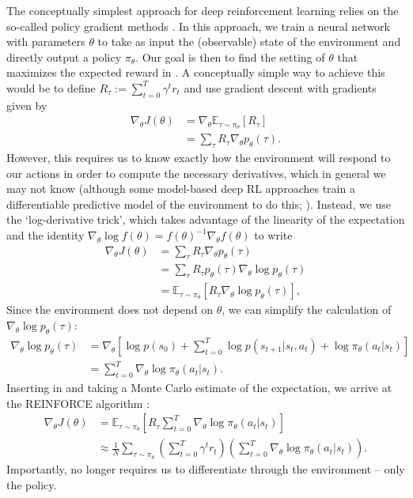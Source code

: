 The conceptually simplest approach for deep reinforcement learning relies on the so-called policy gradient methods \citep{sutton2018reinforcement}.
In this approach, we train a neural network with parameters $\theta$ to take as input the (observable) state of the environment and directly output a policy $\pi_\theta$.
Our goal is then to find the setting of $\theta$ that maximizes the expected reward in .
A conceptually simple way to achieve this would be to define $R_\tau := \sum_{t=0}^T \gamma^t r_t$ and use gradient descent with gradients given by
\begin{align}
    \nabla_\theta J(\theta) &= \nabla_\theta \mathbb{E}_{\tau \sim \pi_\theta} \left [ R_\tau \right ]\\
    &= \sum_{\tau} R_\tau \nabla_\theta p_\theta(\tau).
\end{align}
However, this requires us to know exactly how the environment will respond to our actions in order to compute the necessary derivatives, which in general we may not know (although some model-based deep RL approaches train a differentiable predictive model of the environment to do this; \citealp{clavera2020model}).
Instead, we use the `log-derivative trick', which takes advantage of the linearity of the expectation and the identity $\nabla_\theta \log f(\theta) = f(\theta)^{-1} \nabla_\theta f(\theta)$ to write
\begin{align}
    \label{eq:deriv_J}
    \nabla_\theta J(\theta) & = \sum_\tau R_\tau \nabla_\theta p_\theta(\tau) \\
                            & = \sum_\tau R_\tau p_\theta(\tau) \nabla_\theta \log p_\theta(\tau) \\
                            & = \mathbb{E}_{\tau \sim \pi_\theta} \left [ R_\tau \nabla_\theta \log p_\theta(\tau) \right ],
\end{align}
Since the environment does not depend on $\theta$, we can simplify the calculation of $\nabla_\theta \log p_\theta (\tau)$:
\begin{align}
    \label{eq:deriv_log_ptau}
    \nabla_\theta \log p_\theta(\tau) & = \nabla_\theta \left [ \log p(s_0) + \sum_{t=0}^T \log p(s_{t+1} | s_t, a_t) + \log \pi_\theta (a_t|s_t) \right ] \\
                                      & = \sum_{t=0}^T \nabla_\theta \log \pi_\theta (a_t|s_t).
\end{align}
Inserting  in  and taking a Monte Carlo estimate of the expectation, we arrive at the REINFORCE algorithm \citep{williams1992simple}:
\begin{align}
    \nabla_\theta J(\theta) & = \mathbb{E}_{\tau \sim \pi_\theta} \left [ R_\tau \sum_{t=0}^T \nabla_\theta \log \pi_\theta (a_t|s_t) \right ]                                         \\
                            & \approx \frac{1}{N} \sum_{\tau \sim \pi_\theta} \left ( \sum_{t=0}^T \gamma^t r_t \right ) \left ( \sum_{t=0}^T \nabla_\theta \log \pi_\theta (a_t|s_t) \right ).
    \label{eq:orig_reinforce}
\end{align}
Importantly,  no longer requires us to differentiate through the environment -- only the policy.

